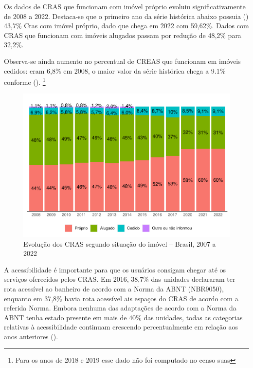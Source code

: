\documentclass[
  brazilian]{report}
\begin{document}
Os dados de CRAS que funcionam com imóvel próprio evoluiu
significativamente de 2008 a 2022. Destaca-se que o primeiro ano da
série histórica abaixo possuia () 43,7\% Cras com
imóvel próprio, dado que chega em 2022 com 59,62\%. Dados com CRAS que
funcionam com imóveis alugados passam por redução de 48,2\% para 32,2\%.

Observa-se ainda aumento no percentual de CREAS que funcionam em imóveis
cedidos: eram 6,8\% em 2008, o maior valor da série histórica chega a
9.1\% conforme ().
\footnote{Para os anos de 2018 e 2019 esse dado não foi computado no censo suas}

\begin{figure}
\includegraphics{Censo-SUAS-2022_files/figure-latex/sit_imovel-1} \caption[Evolução dos CRAS segundo situação do imóvel – Brasil, 2007 a 2022]{Evolução dos CRAS segundo situação do imóvel – Brasil, 2007 a 2022}\label{fig:sit_imovel}
\end{figure}

A acessibilidade é importante para que os usuários consigam chegar até
os serviços oferecidos pelos CRAS. Em 2016, 38,7\% das unidades
declararam ter rota acessível ao banheiro de acordo com a Norma da ABNT
(NBR9050), enquanto em 37,8\% havia rota acessível ais espaços do CRAS
de acordo com a referida Norma. Embora nenhuma das adaptações de acordo
com a Norma da ABNT tenha estado presente em mais de 40\% das unidades,
todas as categorias relativas à acessibilidade continuam crescendo
percentualmente em relação aos anos anteriores
().
\end{document}
